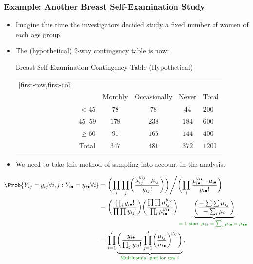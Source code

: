 \documentclass[oneside]{book}\usepackage[]{graphicx}\usepackage[svgnames]{xcolor}
\providecommand\given{} %
\renewcommand\given{\nonscript\:\delimsize\vert\nonscript\:\mathopen{}}%
\renewcommand\given{\nonscript\:\delimsize\vert\nonscript\:\mathopen{}}%
\renewcommand\given{\nonscript\:\delimsize\vert\nonscript\:\mathopen{}}%
\renewcommand\given{\nonscript\:\delimsize\vert\nonscript\:\mathopen{}}%
\renewcommand\given{\nonscript\:\delimsize\vert\nonscript\:\mathopen{}}%
\renewcommand\given{\nonscript\:\delimsize\vert\nonscript\:\mathopen{}}%
\renewcommand\given{\nonscript\:\delimsize\vert\nonscript\:\mathopen{}}%
\renewcommand\given{\nonscript\:\delimsize\vert\nonscript\:\mathopen{}}%
\renewcommand\given{\nonscript\:\delimsize\vert\nonscript\:\mathopen{}}%
\renewcommand\given{\nonscript\:\delimsize\vert\nonscript\:\mathopen{}}%
\renewcommand\given{\nonscript\:\delimsize\vert\nonscript\:\mathopen{}}%
\renewcommand\given{\nonscript\:\delimsize\vert\nonscript\:\mathopen{}}%
\let\exp\relax%
\renewcommand\given{:}
\begin{document}
\subsubsection*{Example: Another Breast Self-Examination Study}
\begin{itemize}
      \item Imagine this time the investigators decided study a fixed number of women of
            each age group.
      \item The (hypothetical) 2-way contingency table is now:
            \begin{Example}{Breast Self-Examination Contingency Table (Hypothetical)}
                  \begin{center}
                        \begin{NiceTabular}{c|ccc|c}[first-row,first-col]
                              &&\\
                              && Monthly & Occasionally & Never & Total\\
                              \midrule
                               & $<$45 & $ 78 $ & $ 78 $ & $ 44 $ & $ 200 $\\
                              & 45--59 & $ 178 $ & $ 238 $ & $ 184 $ & $ 600 $\\
                              & $ \ge $60 & $ 91 $ & $ 165 $ & $ 144 $ & $ 400 $\\
                              \midrule
                              & Total & $ 347 $ & $ 481 $ & $ 372 $ & $ 1200 $
                        \end{NiceTabular}
                  \end{center}
            \end{Example}
      \item We need to take this method of sampling into account in the analysis.
\end{itemize}
\begin{align*}
      \Prob{Y_{ij}=y_{ij}\forall i,j\given Y_{i\bullet}=y_{i\bullet}\forall i}
       & =\biggl(\prod_i \prod_j \biggl(\frac{\mu_{ij}^{y_{ij}} \exp{-\mu_{ij}}}{y_{ij}!}\biggr)\biggr)\Bigg/\biggl(\prod_i \frac{\mu_{i\bullet}^{y_{i\bullet}}\exp{-\mu_{i\bullet}}}{y_{i\bullet}!}\biggr)             \\
       & =\biggl(\frac{\prod_i y_{i\bullet}!}{\prod\prod y_{ij}!}\biggr)\biggl(\frac{\prod\prod \mu_{ij}^{y_{ij}}}{\prod_i \mu_{i\bullet}^{y_{i\bullet}}}\biggr)
      \underbrace{\biggl(\frac{\exp{-\sum\sum \mu_{ij}}}{\exp{-\sum_i \mu_i}}\biggr)}_{\textcolor{Green}{\text{$=1$ since $\mu_{i j}=\sum_i \mu_{i\bullet}=\mu_{\bullet\bullet}$ }}}                                    \\
       & =\prod_{i=1}^I \underbrace{\biggl(\frac{y_{i\bullet}!}{\prod_j y_{ij}!}\prod_{j=1}^J \biggl(\frac{\mu_{ij}}{\mu_{i\bullet}}\biggr)^{\!y_{ij}}\biggr)}_{\textcolor{Green}{\text{Multinomial pmf for row $i$}}}.
\end{align*}
\end{document}
